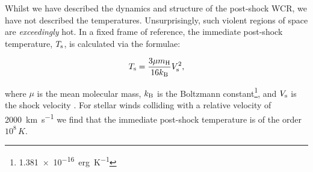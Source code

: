 Whilst we have described the dynamics and structure of the post-shock WCR, we have not described the temperatures.
Unsurprisingly, such violent regions of space are \emph{exceedingly} hot.
In a fixed frame of reference, the immediate post-shock temperature, $T_\text{s}$, is calculated via the formulae:

\begin{equation}
  T_\text{s} = \frac{3\mu m_\text{H}}{16 k_\text{B}} V_\text{s}^2 ,
\end{equation}

\noindent
where $\mu$ is the mean molecular mass, $k_\text{B}$ is the Boltzmann constant\footnote{\SI{1.381e-16}{erg.K^{-1}}}, and $V_\text{s}$ is the shock velocity
\parencite[Ch.~9]{macielHydrodynamicsStellarWinds2014}.
For stellar winds colliding with a relative velocity of \SI{2000}{\kilo\metre\per\second} we find that the immediate post-shock temperature is of the order $10^8\,\si{K}$.


